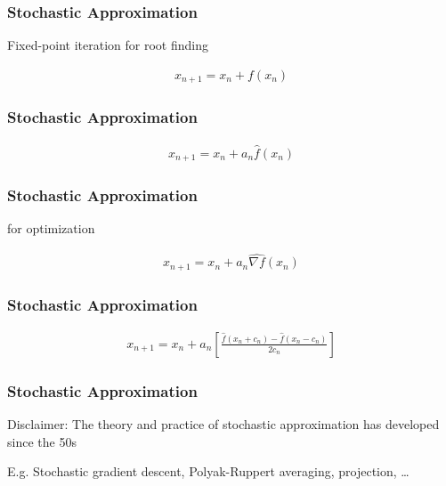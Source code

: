 \documentclass[14pt]{beamer}
\begin{document}
\begin{frame}
    \frametitle{Stochastic Approximation}
    \begin{outline}
        \1 Fixed-point iteration for root finding
    \end{outline}
    \begin{gather*}
            x_{n+1} = x_n + f(x_n)
    \end{gather*}
\end{frame}



\begin{frame}
    \frametitle{Stochastic Approximation}
    \begin{outline}
        \1 \citet{Rob51}
    \end{outline}
    \begin{gather*}
            x_{n+1} = x_n + a_n \hat{f}(x_n)
    \end{gather*}
\end{frame}


\begin{frame}
    \frametitle{Stochastic Approximation}
    \begin{outline}
        \1 \citet{Rob51} for optimization
    \end{outline}
    \begin{gather*}
            x_{n+1} = x_n + a_n \widehat{\nabla f}(x_n)
    \end{gather*}
\end{frame}

\begin{frame}
    \frametitle{Stochastic Approximation}
\begin{outline}
        \1 \citet{Kie52}
    \end{outline}
    \begin{gather*}
            x_{n+1} = x_n + a_n \left[ \frac{\hat{f}(x_n + c_n) - \hat{f}(x_n - c_n)}{2c_n} \right]
    \end{gather*}
\end{frame}


\begin{frame}
    \frametitle{Stochastic Approximation}
    \begin{outline}
        \1 Disclaimer: The theory and practice of stochastic approximation has developed since the 50s \newline

        \1 E.g. Stochastic gradient descent, Polyak-Ruppert averaging, projection, \ldots
    \end{outline}
\end{frame}
\end{document}

